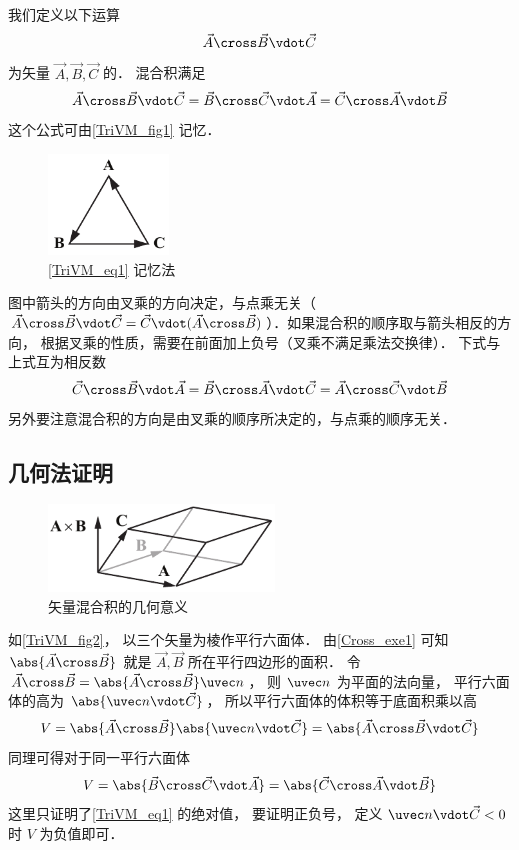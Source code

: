
我们定义以下运算
\begin{equation}
\vec A \cross \vec B \vdot \vec C
\end{equation}
为矢量 $\vec A, \vec B, \vec C$ 的． 混合积满足
\begin{equation}\label{TriVM_eq1}
\vec A \cross \vec B \vdot \vec C = \vec B \cross \vec C \vdot \vec A = \vec C \cross \vec A \vdot \vec B 
\end{equation} 
这个公式可由\autoref{TriVM_fig1} 记忆．
\begin{figure}[ht]
\centering
\includegraphics[width=3.2cm]{./figures/TriVM1.pdf}
\caption{\autoref{TriVM_eq1} 记忆法}\label{TriVM_fig1}
\end{figure}
图中箭头的方向由叉乘的方向决定，与点乘无关（$\vec A\cross \vec B \vdot \vec C = \vec C \vdot (\vec A \cross \vec B)$）．如果混合积的顺序取与箭头相反的方向， 根据叉乘的性质，需要在前面加上负号（叉乘不满足乘法交换律）． 下式与上式互为相反数
\begin{equation}
\vec C \cross \vec B \vdot \vec A = \vec B \cross \vec A \vdot \vec C = \vec A \cross \vec C \vdot \vec B
\end{equation} 
另外要注意混合积的方向是由叉乘的顺序所决定的，与点乘的顺序无关．

\subsection{几何法证明}

\begin{figure}[ht]
\centering
\includegraphics[width=6cm]{./figures/TriVM2.pdf}
\caption{矢量混合积的几何意义} \label{TriVM_fig2}
\end{figure}

如\autoref{TriVM_fig2}， 以三个矢量为棱作平行六面体． 由\autoref{Cross_exe1} 可知 $\abs{\vec A \cross \vec B}$ 就是 $\vec A,\vec B$ 所在平行四边形的面积． 令 $\vec A \cross \vec B = \abs{\vec A \cross \vec B} \uvec n$， 则 $\uvec n$ 为平面的法向量， 平行六面体的高为 $\abs{\uvec n \vdot \vec C}$， 所以平行六面体的体积等于底面积乘以高
\begin{equation}
V = \abs{\vec A \cross \vec B} \abs{\uvec n \vdot \vec C} = \abs{\vec A \cross \vec B \vdot \vec C}
\end{equation}
同理可得对于同一平行六面体
\begin{equation}
V = \abs{\vec B \cross \vec C \vdot \vec A} = \abs{\vec C \cross \vec A \vdot \vec B} 
\end{equation}  
这里只证明了\autoref{TriVM_eq1} 的绝对值， 要证明正负号， 定义 $\uvec n \vdot \vec C < 0$ 时 $V$ 为负值即可．

